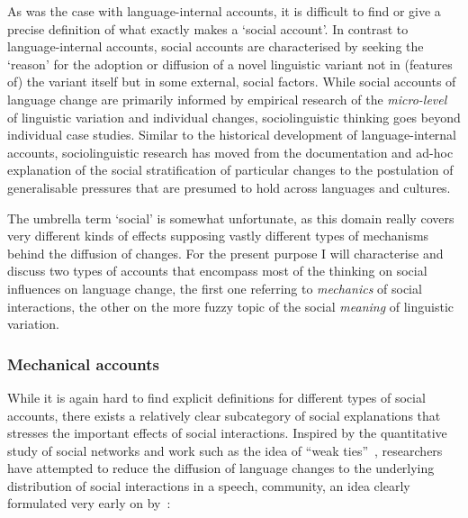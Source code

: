 As was the case with language-internal accounts, it is difficult to find or give a precise definition of what exactly makes a `social account'. In contrast to language-internal accounts, social accounts are characterised by seeking the `reason' for the adoption or diffusion of a novel linguistic variant not in (features of) the variant itself but in some external, social factors.
While social accounts of language change are primarily informed by empirical research of the \emph{micro-level} of linguistic variation and individual changes, sociolinguistic thinking goes beyond individual case studies.
Similar to the historical development of language-internal accounts, sociolinguistic research %
has moved from the documentation and ad-hoc explanation of the social stratification of particular changes to the postulation of generalisable pressures that are presumed to hold across languages and cultures.


The umbrella term `social' is somewhat unfortunate, as this domain really covers very different kinds of effects supposing vastly different types of mechanisms behind the diffusion of changes. For the present purpose I will characterise and discuss two types of accounts that encompass most of the thinking on social influences on language change, the first one referring to \emph{mechanics} of social interactions, the other on the more fuzzy topic of the social \emph{meaning} of linguistic variation.

\subsubsection{Mechanical accounts}
\label{sec:interactorselection}

While it is again hard to find explicit definitions for different types of social accounts, there exists a relatively clear subcategory of social explanations that stresses the important effects of social interactions. 
Inspired by the quantitative study of social networks and work such as the idea of ``weak ties''~\citep{Granovetter1973}, researchers have attempted to reduce the diffusion of language changes to the underlying distribution of social interactions in a speech, community, an idea clearly formulated very early on by~\citet[p.476]{Bloomfield1933}:

